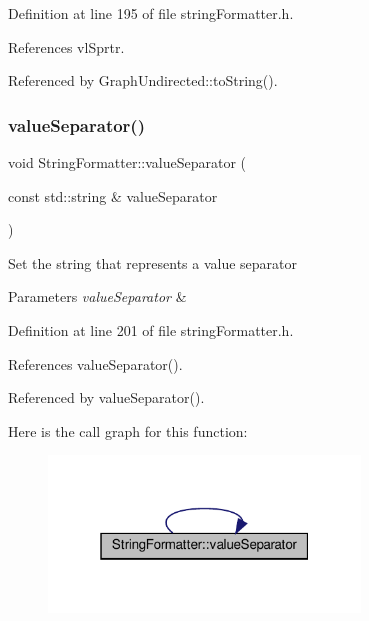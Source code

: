 Definition at line 195 of file string\+Formatter.\+h.



References vl\+Sprtr.



Referenced by Graph\+Undirected\+::to\+String().

\mbox{\label{classStringFormatter_ad5cd476a9edf0c24717d7edf2d3f4489}} 
\subsubsection{\texorpdfstring{value\+Separator()}{valueSeparator()}\hspace{0.1cm}{\footnotesize\ttfamily [2/2]}}
{\footnotesize\ttfamily void String\+Formatter\+::value\+Separator (\begin{DoxyParamCaption}\item[{const std\+::string \&}]{value\+Separator }\end{DoxyParamCaption})\hspace{0.3cm}{\ttfamily [inline]}}

Set the string that represents a value separator 
\begin{DoxyParams}{Parameters}
{\em value\+Separator} & \\
\hline
\end{DoxyParams}


Definition at line 201 of file string\+Formatter.\+h.



References value\+Separator().



Referenced by value\+Separator().

Here is the call graph for this function\+:
\nopagebreak
\begin{figure}[H]
\begin{center}
\leavevmode
\includegraphics[width=235pt]{classStringFormatter_ad5cd476a9edf0c24717d7edf2d3f4489_cgraph}
\end{center}
\end{figure}


